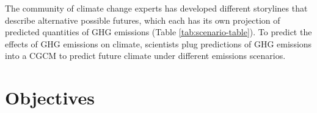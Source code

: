\documentclass[]{book}
\begin{document}
The community of climate change experts has developed different storylines that describe alternative possible futures, which each has its own projection of predicted quantities of GHG emissions (Table \ref{tab:scenario-table}). To predict the effects of GHG emissions on climate, scientists plug predictions of GHG emissions into a CGCM to predict future climate under different emissions scenarios.

\begin{table}

\caption{\label{tab:scenario-table}Characteristics of selected emissions scenarios from the Intergovernmental Panel on Climate Change. These scenarios represent alternative possibilities for future social and technological change as envisioned by a collaboration of governmental and non-governmental analysts.}
\centering
{}
\end{table}

\hypertarget{objectives-5}{%
\section{Objectives}\label{objectives-5}}
\end{document}
